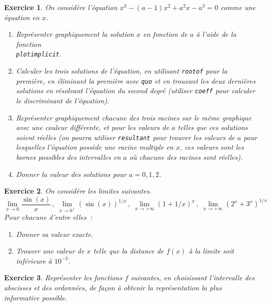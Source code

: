 \documentclass{article}
\newtheorem{exo}{Exercice}[section]
\begin{document}
\begin{giacjshere}
\begin{exo}{\rm
On consid\`ere l'\'equation $x^3-(a-1)x^2+a^2x-a^3=0$ comme une
\'equation en $x$. 
\begin{enumerate}
\item
Repr\'esenter graphiquement la solution $x$ en fonction de $a$ \`a l'aide
de la fonction\\ \verb|plotimplicit|.
\item
Calculer les trois solutions de l'\'equation, en utilisant \verb|rootof|
pour la premi\`ere, en \'eliminant la premi\`ere avec \verb|quo| et en
trouvant les deux derni\`eres solutions en r\'esolvant l'\'equation
du second degr\'e (utiliser \verb|coeff| pour calculer le discriminant
de l'\'equation).
\item
Repr\'esenter graphiquement chacune des
trois racines sur le m\^eme graphique avec une couleur
diff\'erente, et pour les valeurs de $a$
telles que ces solutions soient r\'eelles (on pourra utiliser
\verb|resultant| pour trouver les valeurs de $a$ pour lesquelles
l'\'equation poss\`ede une racine multiple en $x$, ces valeurs
sont les bornes possibles des intervalles en $a$ o\`u chacune des
racines sont r\'eelles).
\item
Donner la valeur des
solutions pour $a=0,1,2$.
\end{enumerate} 
}\end{exo}
\begin{exo}{\rm
On consid\`ere les limites suivantes.
$$
\lim_{x\rightarrow 0} \frac{\sin(x)}{x}
\,,\;
\lim_{x\rightarrow 0^+} (\sin(x))^{1/x}
\,,\;
\lim_{x\rightarrow +\infty} (1+1/x)^{x}
\,,\;
\lim_{x\rightarrow +\infty} (2^x+3^x)^{1/x}
$$
Pour chacune d'entre elles~:
\begin{enumerate}
\item
Donner sa valeur exacte.
\item
Trouver une valeur de $x$ telle que la distance de $f(x)$ \`a la
limite soit inf\'erieure \`a $10^{-3}$.
\end{enumerate} 
}\end{exo}
\begin{exo}{\rm
Repr\'esenter les fonctions $f$ suivantes, en choisissant l'intervalle
des abscisses et des ordonn\'ees, de fa\c{c}on \`a obtenir 
la repr\'esentation la plus informative possible. 
\begin{enumerate}

\end{enumerate}}
\end{exo}
\end{giacjshere}
\end{document}

